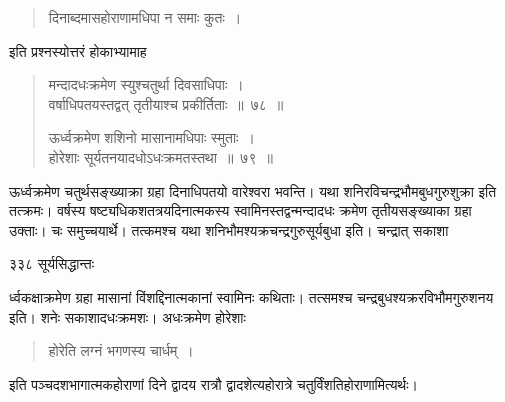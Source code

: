 \documentclass[11pt, openany]{book}
\begin{document}

\begin{quote}
 {\qt दिनाब्दमासहोराणामधिपा न समाः कुतः~। }
 \end{quote}

इति प्रश्नस्योत्तरं होकाभ्यामाह\textendash


\begin{quote}
 {\ssi मन्दादधःक्रमेण स्युश्चतुर्था दिवसाधिपाः~।\\
वर्षाधिपतयस्तद्वत् तृतीयाश्च प्रकीर्तिताः~॥~७८~॥

ऊर्ध्वक्रमेण शशिनो मासानामधिपाः स्मुताः~।\\
होरेशाः सूर्यतनयादधोऽधःक्रमतस्तथा~॥~७९~॥}
\end{quote}
\noindent

 ऊर्ध्वक्रमेण चतुर्थसङ्ख्याक्रा ग्रहा दिनाधिपतयो वारेश्वरा भवन्ति। यथा शनिरविचन्द्रभौमबुधगुरुशुक्रा इति तत्क्रमः। वर्षस्य षष्ट्यधिकशतत्रयदिनात्मकस्य स्वामिनस्तद्वन्मन्दादधः क्रमेण तृतीयसङ्ख्याका ग्रहा उक्ताः। चः समुच्चयार्थे। तत्कमश्च यथा शनिभौमश्यक्रचन्द्रगुरुसूर्यबुधा इति। चन्द्रात् सकाशा\textendash



\newpage


\noindent ३३८ \hspace{4cm} सूर्यसिद्धान्तः
\vspace{1cm}


\noindent र्ध्वकक्षाक्रमेण ग्रहा मासानां विंशद्दिनात्मकानां स्वामिनः कथिताः। तत्समश्च चन्द्रबुधश्यक्ररविभौमगुरुशनय इति। शनेः सकाशादधःक्रमशः। अधःक्रमेण होरेशाः 


\begin{quote}
 {\qt होरेति लग्नं भगणस्य चार्धम्~। }
 \end{quote}

इति पञ्चदशभागात्मकहोराणां दिने द्वादय रात्रौ द्वादशेत्यहोरात्रे चतुर्विंशतिहोराणामित्यर्थः। 

\end{document}
